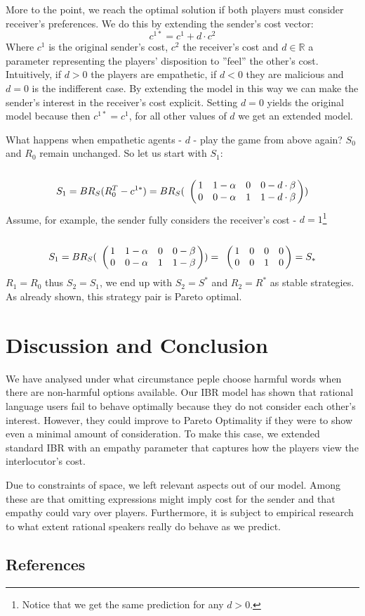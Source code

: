 \documentclass[10pt]{article}
\begin{document}
More to the point, we reach the optimal solution if both players must consider receiver's preferences. We do this by extending the sender's cost vector:
$$c^{1*}=c^{1} + d \cdot c^{2}$$
Where $c^{1}$ is the original sender's cost, $c^{2}$ the receiver's cost and $d \in \mathbb{R}$ a parameter representing the players' disposition to ''feel'' the other's cost. Intuitively, if $d>0$ the players are empathetic, if $d<0$ they are malicious and $d=0$ is the indifferent case. By extending the model in this way we can make the sender's interest in the receiver's cost explicit. Setting $d=0$ yields the original model because then $c^{1*}=c^{1}$, for all other values of $d$ we get an extended model. 

What happens when empathetic agents - $d$ - play the game from above again? $S_0$ and $R_0$ remain unchanged. So let us start with $S_1$:
\begin{equation*}
S_1= BR_S(R_0^T-c^{1*})=BR_S(
\bordermatrix{
                & & & &    \cr
     &       1 &         1-\alpha & 0       & 0-d\cdot \beta \cr
     &       0 &         0-\alpha & 1      & 1-d\cdot \beta
 }
)
\end{equation*}
Assume, for example, the sender fully considers the receiver's cost - $d=1$\footnote{Notice that we get the same prediction for any $d>0$.}
\begin{equation*}
S_1=BR_S(
\bordermatrix{
                & & & &    \cr
     &       1 &         1-\alpha & 0       & 0-\beta \cr
     &       0 &         0-\alpha & 1      & 1-\beta
 }
 )
=
\bordermatrix{
                & & & &    \cr
     &       1 &         0 & 0       & 0 \cr
     &       0 &         0 & 1      & 0
 }
 =S_*
 \end{equation*}
$R_1=R_0$ thus $S_2=S_1$, we end up with $S_2=S^*$ and $R_2=R^*$ as stable strategies.
As already shown, this strategy pair is Pareto optimal.
\section{Discussion and Conclusion}
We have analysed under what circumstance peple choose harmful words when there are non-harmful options available.
Our IBR model has shown that rational language users fail to behave optimally because they do not consider each other's interest. However, they could improve to Pareto Optimality if they were to show even a minimal amount of consideration. To make this case, we extended standard IBR with an empathy parameter that captures how the players view the interlocutor's cost.

Due to constraints of space, we left relevant aspects out of our model. Among these are that omitting expressions might imply cost for the sender and that empathy could vary over players. Furthermore, it is subject to empirical research to what extent rational speakers really do behave as we predict.

\subsection{References}
\end{document}
